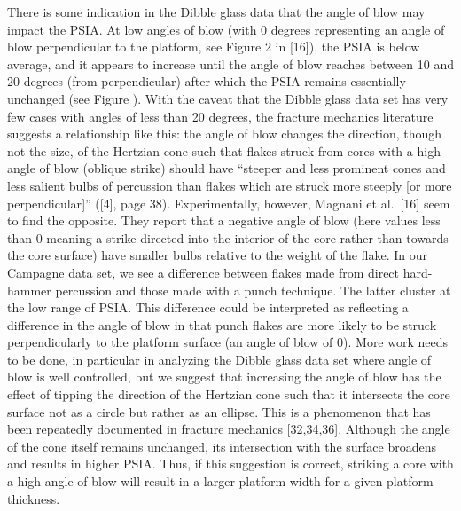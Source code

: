 \documentclass[10pt,letterpaper]{article}
\begin{document}
There is some indication in the Dibble glass data that the angle of blow
may impact the PSIA. At low angles of blow (with 0 degrees representing
an angle of blow perpendicular to the platform, see Figure 2 in
{[}16{]}), the PSIA is below average, and it appears to increase until
the angle of blow reaches between 10 and 20 degrees (from perpendicular)
after which the PSIA remains essentially unchanged (see Figure ). With
the caveat that the Dibble glass data set has very few cases with angles
of less than 20 degrees, the fracture mechanics literature suggests a
relationship like this: the angle of blow changes the direction, though
not the size, of the Hertzian cone such that flakes struck from cores
with a high angle of blow (oblique strike) should have ``steeper and
less prominent cones and less salient bulbs of percussion than flakes
which are struck more steeply {[}or more perpendicular{]}'' ({[}4{]},
page 38). Experimentally, however, Magnani et al.~{[}16{]} seem to find
the opposite. They report that a negative angle of blow (here values
less than 0 meaning a strike directed into the interior of the core
rather than towards the core surface) have smaller bulbs relative to the
weight of the flake. In our Campagne data set, we see a difference
between flakes made from direct hard-hammer percussion and those made
with a punch technique. The latter cluster at the low range of PSIA.
This difference could be interpreted as reflecting a difference in the
angle of blow in that punch flakes are more likely to be struck
perpendicularly to the platform surface (an angle of blow of 0). More
work needs to be done, in particular in analyzing the Dibble glass data
set where angle of blow is well controlled, but we suggest that
increasing the angle of blow has the effect of tipping the direction of
the Hertzian cone such that it intersects the core surface not as a
circle but rather as an ellipse. This is a phenomenon that has been
repeatedly documented in fracture mechanics {[}32,34,36{]}. Although the
angle of the cone itself remains unchanged, its intersection with the
surface broadens and results in higher PSIA. Thus, if this suggestion is
correct, striking a core with a high angle of blow will result in a
larger platform width for a given platform thickness.
\end{document}
